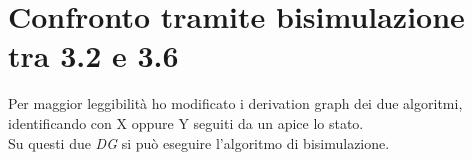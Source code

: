 \documentclass[a4paper]{article}
\begin{document}
\section{Confronto tramite bisimulazione tra 3.2 e 3.6}
Per maggior leggibilità ho modificato i derivation graph dei due algoritmi, identificando con X oppure Y seguiti da un apice lo stato.\\
\newpage
Su questi due \textit{DG} si può eseguire l'algoritmo di bisimulazione.
\end{document}
